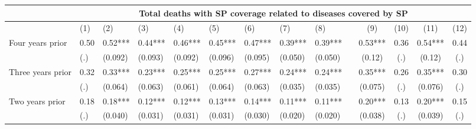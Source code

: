 \begin{tabular}{lccccrrrrrcccc}
\toprule
      & \multicolumn{13}{c}{Total deaths with SP coverage related to diseases covered by SP} \\
\midrule
      & \multicolumn{1}{l}{(1)} & \multicolumn{1}{l}{(2)} & \multicolumn{1}{l}{(3)} & \multicolumn{1}{l}{(4)} & \multicolumn{1}{l}{(5)} & \multicolumn{1}{l}{(6)} & \multicolumn{1}{l}{(7)} & \multicolumn{1}{l}{(8)} &       & (9)   & (10)  & (11)  & (12) \\
\midrule
\midrule
Four years prior & \multicolumn{1}{l}{0.50} & \multicolumn{1}{l}{0.52***} & \multicolumn{1}{l}{0.44***} & \multicolumn{1}{l}{0.46***} & \multicolumn{1}{l}{0.45***} & \multicolumn{1}{l}{0.47***} & \multicolumn{1}{l}{0.39***} & \multicolumn{1}{l}{0.39***} &       & 0.53*** & 0.36  & 0.54*** & 0.44 \\
      & \multicolumn{1}{l}{(.)} & \multicolumn{1}{l}{(0.092)} & \multicolumn{1}{l}{(0.093)} & \multicolumn{1}{l}{(0.092)} & \multicolumn{1}{l}{(0.096)} & \multicolumn{1}{l}{(0.095)} & \multicolumn{1}{l}{(0.050)} & \multicolumn{1}{l}{(0.050)} &       & (0.12) & (.)   & (0.12) & (.) \\
Three years prior & \multicolumn{1}{l}{0.32} & \multicolumn{1}{l}{0.33***} & \multicolumn{1}{l}{0.23***} & \multicolumn{1}{l}{0.25***} & \multicolumn{1}{l}{0.25***} & \multicolumn{1}{l}{0.27***} & \multicolumn{1}{l}{0.24***} & \multicolumn{1}{l}{0.24***} &       & 0.35*** & 0.26  & 0.35*** & 0.30 \\
      & \multicolumn{1}{l}{(.)} & \multicolumn{1}{l}{(0.064)} & \multicolumn{1}{l}{(0.063)} & \multicolumn{1}{l}{(0.061)} & \multicolumn{1}{l}{(0.064)} & \multicolumn{1}{l}{(0.063)} & \multicolumn{1}{l}{(0.035)} & \multicolumn{1}{l}{(0.035)} &       & (0.075) & (.)   & (0.076) & (.) \\
Two years prior & \multicolumn{1}{l}{0.18} & \multicolumn{1}{l}{0.18***} & \multicolumn{1}{l}{0.12***} & \multicolumn{1}{l}{0.12***} & \multicolumn{1}{l}{0.13***} & \multicolumn{1}{l}{0.14***} & \multicolumn{1}{l}{0.11***} & \multicolumn{1}{l}{0.11***} &       & 0.20*** & 0.13  & 0.20*** & 0.15 \\
      & \multicolumn{1}{l}{(.)} & \multicolumn{1}{l}{(0.040)} & \multicolumn{1}{l}{(0.031)} & \multicolumn{1}{l}{(0.031)} & \multicolumn{1}{l}{(0.031)} & \multicolumn{1}{l}{(0.030)} & \multicolumn{1}{l}{(0.020)} & \multicolumn{1}{l}{(0.020)} &       & (0.038) & (.)   & (0.039) & (.) \\

\end{tabular}
